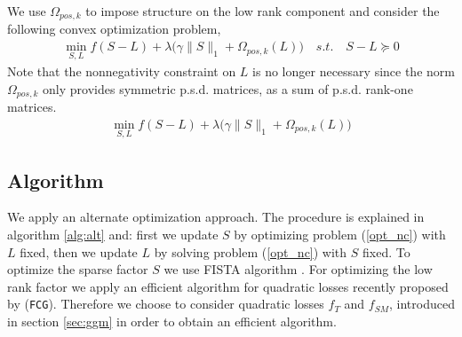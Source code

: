 We use $\Omega_{pos,k}$ to impose structure on the low rank component and consider the following convex optimization problem,
\begin{align}
\label{opt}
\min_{S,L} f(S-L)+\lambda\big(\gamma\|S\|_{1}+\Omega_{pos,k}(L)\big) \quad s.t. \quad S-L \succeq 0 
\end{align}
Note that the nonnegativity constraint on $L$ is no longer necessary since the norm $\Omega_{pos,k}$ only provides symmetric p.s.d. matrices, as a sum of p.s.d. rank-one matrices.
\begin{align}
\label{opt_nc}
\min_{S,L} f(S-L)+\lambda\big(\gamma\|S\|_{1}+\Omega_{pos,k}(L)\big)
\end{align}
%

\subsection{Algorithm}
\label{subsec:alg}


We apply an alternate optimization approach. The procedure is explained in algorithm \ref{alg:alt} and: first we update $S$ by optimizing problem (\ref{opt_nc}) with $L$ fixed, then we update $L$ by solving problem (\ref{opt_nc}) with $S$ fixed. To optimize the sparse factor $S$ we use FISTA algorithm \citep{beck2009fast}. For optimizing the low rank factor we apply an efficient algorithm for quadratic losses recently proposed by \citet{vinyes2017}(\texttt{FCG}). Therefore we choose to consider quadratic losses $f_{T}$ and $f_{SM}$, introduced in section \ref{sec:ggm} in order to obtain an efficient algorithm.

